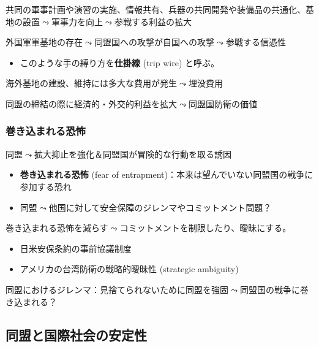 \documentclass[
  xelatex,
  ja=standard]{bxjsarticle}
\providecommand{\tightlist}{%
  \setlength{\itemsep}{0pt}\setlength{\parskip}{0pt}}\usepackage{longtable,booktabs,array}
\begin{document}
共同の軍事計画や演習の実施、情報共有、兵器の共同開発や装備品の共通化、基地の設置\(\leadsto\)軍事力を向上\(\leadsto\)参戦する利益の拡大

外国軍軍基地の存在\(\leadsto\)同盟国への攻撃が自国への攻撃\(\leadsto\)参戦する信憑性

\begin{itemize}
\tightlist
\item
  このような手の縛り方を\textbf{仕掛線} (trip wire)
  と呼ぶ\citep{schelling2018}。
\end{itemize}

海外基地の建設、維持には多大な費用が発生\(\leadsto\)埋没費用\citep{fearon1997}

同盟の締結の際に経済的・外交的利益を拡大\(\leadsto\)同盟国防衛の価値\citep{gowa1993, poast2012}

\hypertarget{ux5dfbux304dux8fbcux307eux308cux308bux6050ux6016}{%
\subsubsection{巻き込まれる恐怖}\label{ux5dfbux304dux8fbcux307eux308cux308bux6050ux6016}}

同盟\(\leadsto\)拡大抑止を強化＆同盟国が冒険的な行動を取る誘因

\begin{itemize}
\tightlist
\item
  \textbf{巻き込まれる恐怖} (fear of
  entrapment)：本来は望んでいない同盟国の戦争に参加する恐れ\citep{snyder1984}
\item
  同盟\(\leadsto\)他国に対して安全保障のジレンマやコミットメント問題？
\end{itemize}

巻き込まれる恐怖を減らす\(\leadsto\)コミットメントを制限したり、曖昧にする。

\begin{itemize}
\tightlist
\item
  日米安保条約の事前協議制度
\item
  アメリカの台湾防衛の戦略的曖昧性 (strategic ambiguity)
\end{itemize}

同盟におけるジレンマ：見捨てられないために同盟を強固\(\leadsto\)同盟国の戦争に巻き込まれる？

\hypertarget{ux540cux76dfux3068ux56fdux969bux793eux4f1aux306eux5b89ux5b9aux6027}{%
\subsection{同盟と国際社会の安定性}\label{ux540cux76dfux3068ux56fdux969bux793eux4f1aux306eux5b89ux5b9aux6027}}
\end{document}
